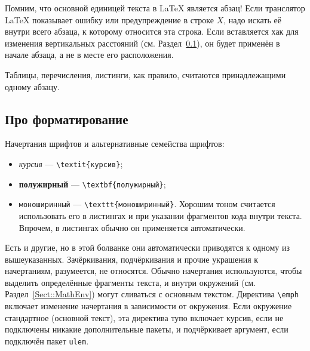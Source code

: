 \documentclass[14pt, russian]{scrartcl}
\begin{document}
Помним, что основной единицей текста в \LaTeX{} является абзац! Если транслятор \LaTeX{} показывает ошибку или предупреждение в строке $X$, надо искать её внутри всего абзаца, к которому относится эта строка. Если вставляется хак для изменения вертикальных расстояний (см. Раздел~\ref{sect:formatting}), он будет применён в начале абзаца, а не в месте его расположения.

Таблицы, перечисления, листинги, как правило, считаются принадлежащими одному абзацу.

\subsection{Про форматирование}\label{sect:formatting}

Начертания шрифтов и альтернативные семейства шрифтов:
\begin{itemize}
\item \textit{курсив} --- \texttt{\textbackslash textit\{курсив\}};
\item \textbf{полужирный} --- \texttt{\textbackslash textbf\{полужирный\}};
\item \texttt{моноширинный} --- \texttt{\textbackslash texttt\{моноширинный\}}. Хорошим тоном считается использовать его в листингах и при указании фрагментов кода внутри текста. Впрочем, в листингах обычно он применяется автоматически.
\end{itemize}

Есть и другие, но в этой болванке они автоматически приводятся к одному из вышеуказанных. Зачёркивания, подчёркивания и прочие украшения к начертаниям, разумеется, не относятся. Обычно начертания используются, чтобы выделить определённые фрагменты текста, и внутри окружений (см. Раздел~\ref{Sect::MathEnv}) могут сливаться с основным текстом. Директива \texttt{\textbackslash emph} включает изменение начертания в зависимости от окружения. Если окружение стандартное (основной текст), эта директива тупо включает курсив, если не подключены никакие дополнительные пакеты, и подчёркивает аргумент, если подключён пакет \texttt{ulem}.
 
\end{document}
